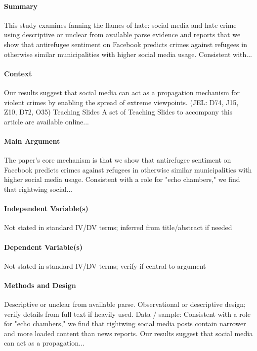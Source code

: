 \documentclass[12pt]{article}
\begin{document}
\paragraph{Summary} This study examines fanning the flames of hate: social media and hate crime using descriptive or unclear from available parse evidence and reports that we show that antirefugee sentiment on Facebook predicts crimes against refugees in otherwise similar municipalities with higher social media usage. Consistent with...

\paragraph{Context} Our results suggest that social media can act as a propagation mechanism for violent crimes by enabling the spread of extreme viewpoints. (JEL: D74, J15, Z10, D72, O35) Teaching Slides A set of Teaching Slides to accompany this article are available online...

\paragraph{Main Argument} The paper's core mechanism is that we show that antirefugee sentiment on Facebook predicts crimes against refugees in otherwise similar municipalities with higher social media usage. Consistent with a role for "echo chambers," we find that rightwing social...

\paragraph{Independent Variable(s)} Not stated in standard IV/DV terms; inferred from title/abstract if needed

\paragraph{Dependent Variable(s)} Not stated in standard IV/DV terms; verify if central to argument

\paragraph{Methods and Design} Descriptive or unclear from available parse. Observational or descriptive design; verify details from full text if heavily used. Data / sample: Consistent with a role for "echo chambers," we find that rightwing social media posts contain narrower and more loaded content than news reports. Our results suggest that social media can act as a propagation...
\end{document}
